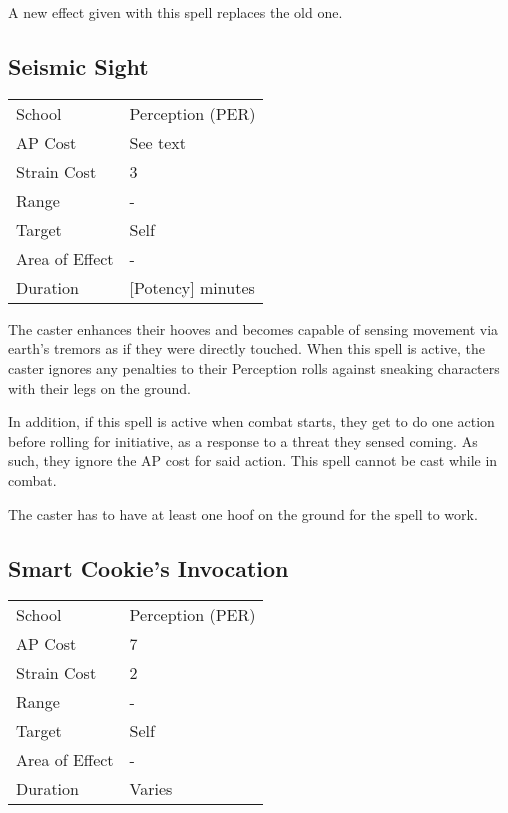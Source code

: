 \documentclass[11pt,a4paper,twocolumn]{book}
\begin{document}
A new effect given with this spell replaces the old one.


\subsection*{Seismic Sight}
{
	\begin{tabu} to 75mm{| X[l,4] | X[l,7] |}
		\hline
		School 			& Perception (PER) 	\\
		AP Cost	      	& See text 				\\
		Strain Cost     & 3 				\\
		Range     		& - 				\\
		Target      	& Self 				\\
		Area of Effect  & - 	 			\\
		Duration     	& [Potency] minutes \\ \hline
	\end{tabu}
}

\medskip

The caster enhances their hooves and becomes capable of sensing movement via earth's tremors as if they were directly touched. When this spell is active, the caster ignores any penalties to their Perception rolls against sneaking characters with their legs on the ground.

In addition, if this spell is active when combat starts, they get to do one action before rolling for initiative, as a response to a threat they sensed coming. As such, they ignore the AP cost for said action. This spell cannot be cast while in combat.

The caster has to have at least one hoof on the ground for the spell to work.

\vfill

\subsection*{Smart Cookie's Invocation}
{
	\begin{tabu} to 75mm{| X[l,4] | X[l,7] |}
		\hline
		School 			& Perception (PER) 	\\
		AP Cost	      	& 7 				\\
		Strain Cost     & 2 				\\
		Range     		& - 				\\
		Target      	& Self 				\\
		Area of Effect  & - 	 			\\
		Duration     	& Varies 			\\ \hline
	\end{tabu}
	
}
\end{document}
